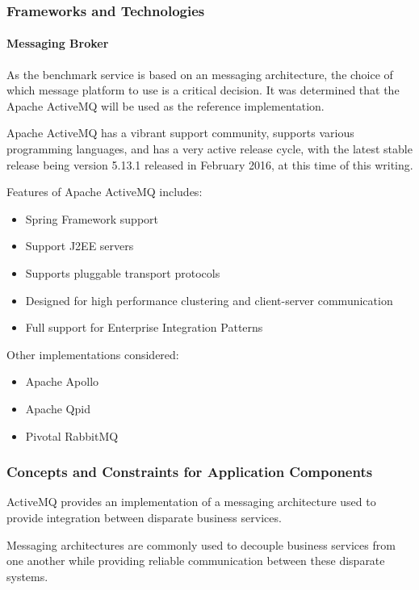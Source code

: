 \subsubsection{Frameworks and Technologies}
\paragraph*{Messaging Broker}
As the benchmark service is based on an messaging architecture,
the choice of which message platform to use is a critical decision. It was
determined that the Apache ActiveMQ will be used as the reference implementation. 

Apache ActiveMQ has a vibrant support community, supports various programming
languages, and has a very active release cycle, with the latest stable release
being version 5.13.1 released in February 2016, at this time of this writing.

Features of Apache ActiveMQ includes:
\begin{itemize}
	\item Spring Framework support
	\item Support J2EE servers
	\item Supports pluggable transport protocols
	\item Designed for high performance clustering and client-server communication
	\item Full support for Enterprise Integration Patterns
\end{itemize}

Other implementations considered:
\begin{itemize}
	\item Apache Apollo
	\item Apache Qpid
	\item Pivotal RabbitMQ
\end{itemize}

\subsubsection{Concepts and Constraints for Application Components}
ActiveMQ provides an implementation of a messaging architecture used to provide
integration between disparate business services.

Messaging architectures are commonly used to decouple business services from 
one another while providing reliable communication between these disparate 
systems. 
